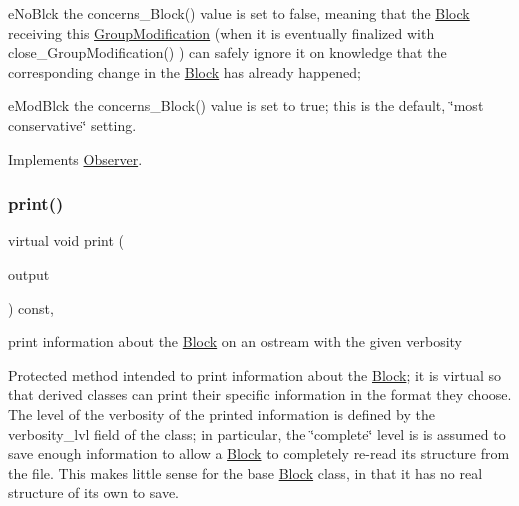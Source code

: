 \begin{DoxyItemize}
\item e\+No\+Blck the concerns\+\_\+\+Block() value is set to false, meaning that the \mbox{\hyperlink{class_s_m_spp__di__unipi__it_1_1_block}{Block}} receiving this \mbox{\hyperlink{class_s_m_spp__di__unipi__it_1_1_group_modification}{Group\+Modification}} (when it is eventually finalized with close\+\_\+\+Group\+Modification() ) can safely ignore it on knowledge that the corresponding change in the \mbox{\hyperlink{class_s_m_spp__di__unipi__it_1_1_block}{Block}} has already happened;
\item e\+Mod\+Blck the concerns\+\_\+\+Block() value is set to true; this is the default, \char`\"{}most conservative\char`\"{} setting. 
\end{DoxyItemize}

Implements \mbox{\hyperlink{class_s_m_spp__di__unipi__it_1_1_observer_acf7e46d450779f524e3655c5f31eecc8}{Observer}}.

\mbox{\label{class_s_m_spp__di__unipi__it_1_1_block_a2e7b9c9148a98c5c342e8c25cac95926}} 
\subsubsection{\texorpdfstring{print()}{print()}}
{\footnotesize\ttfamily virtual void print (\begin{DoxyParamCaption}\item[{std\+::ostream \&}]{output }\end{DoxyParamCaption}) const\hspace{0.3cm}{\ttfamily [protected]}, {\ttfamily [virtual]}}



print information about the \mbox{\hyperlink{class_s_m_spp__di__unipi__it_1_1_block}{Block}} on an ostream with the given verbosity 

Protected method intended to print information about the \mbox{\hyperlink{class_s_m_spp__di__unipi__it_1_1_block}{Block}}; it is virtual so that derived classes can print their specific information in the format they choose. The level of the verbosity of the printed information is defined by the verbosity\+\_\+lvl field of the class; in particular, the \char`\"{}complete\char`\"{} level is is assumed to save enough information to allow a \mbox{\hyperlink{class_s_m_spp__di__unipi__it_1_1_block}{Block}} to completely re-\/read its structure from the file. This makes little sense for the base \mbox{\hyperlink{class_s_m_spp__di__unipi__it_1_1_block}{Block}} class, in that it has no real structure of its own to save. 

